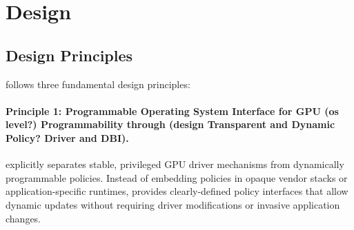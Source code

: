 

\section{\sys Design}

\subsection{Design Principles}

\sys follows three fundamental design principles:

\paragraph{Principle 1: Programmable Operating System Interface for GPU (os level?)  Programmability through (design Transparent and Dynamic Policy? Driver and DBI).}
\sys explicitly separates stable, privileged GPU driver mechanisms from dynamically programmable policies. Instead of embedding policies in opaque vendor stacks or application-specific runtimes, \sys provides clearly-defined policy interfaces that allow dynamic updates without requiring driver modifications or invasive application changes.

